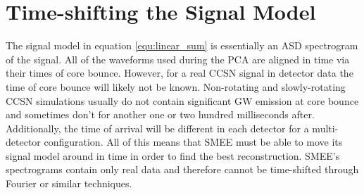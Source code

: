 \section{Time-shifting the Signal Model} \label{sec:timeshift}

The signal model in equation \ref{equ:linear_sum} is essentially an ASD spectrogram of the signal. All of the waveforms used during the PCA are aligned in time via their times of core bounce. However, for a real CCSN signal in detector data the time of core bounce will likely not be known. Non-rotating and slowly-rotating CCSN simulations usually do not contain significant GW emission at core bounce and sometimes don't for another one or two hundred milliseconds after. Additionally, the time of arrival will be different in each detector for a multi-detector configuration. All of this means that SMEE must be able to move its signal model around in time in order to find the best reconstruction. SMEE's spectrograms contain only real data and therefore cannot be time-shifted through Fourier or similar techniques.

